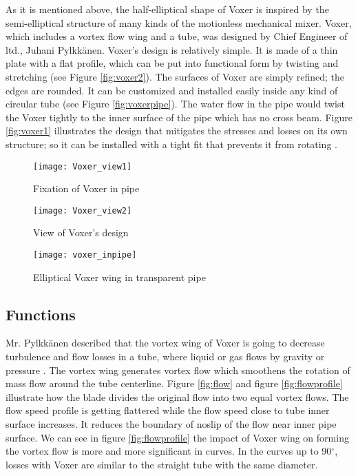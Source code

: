 As it is mentioned above, the half-elliptical shape of Voxer is inspired by the semi-elliptical structure of many kinds of the motionless mechanical mixer. Voxer, which includes a vortex flow wing and a tube, was designed by Chief Engineer of \gls{ltd}., Juhani Pylkkänen. Voxer's design is relatively simple. It is made of a thin plate with a flat profile, which can be put into functional form by twisting and stretching (see Figure \vref{fig:voxer2}). The surfaces of Voxer are simply refined; the edges are rounded. It can be customized and installed easily inside any kind of circular tube (see Figure \vref{fig:voxerpipe}). The water flow in the pipe would twist the Voxer tightly to the inner surface of the pipe which has no cross beam. Figure \vref{fig:voxer1} illustrates the design that mitigates the stresses and losses on its own structure; so it can be installed with a tight fit that prevents it from rotating \cite{voxer:article}.

\begin{figure}[h]
  \centering
  \texttt{[image: Voxer\_view1]}
  \caption{ Fixation of Voxer in pipe \cite{voxer:article}}
  \label{fig:voxer1}
\end{figure}

\begin{figure}[h]
  \centering
  \texttt{[image: Voxer\_view2]}
  \caption{ View of Voxer's design \cite{voxer:article}}
  \label{fig:voxer2}
\end{figure}

\begin{figure}[h]
  \centering
  \texttt{[image: voxer\_inpipe]}
  \caption{ Elliptical Voxer wing in transparent pipe}
  \label{fig:voxerpipe}
\end{figure}

\subsection{Functions}

Mr. Pylkkänen described that the vortex wing of Voxer is going to decrease turbulence and flow losses in a tube, where liquid or gas flows by gravity or pressure \cite{voxer:article}. The vortex wing generates vortex flow which smoothens the rotation of mass flow around the tube centerline. Figure \vref{fig:flow} and figure \vref{fig:flowprofile} illustrate how the blade divides the original flow into two equal vortex flows. The flow speed profile is getting flattered while the flow speed close to tube inner surface increases. It reduces the boundary of \gls{noslip} of the flow near inner pipe surface. We can see in figure \vref{fig:flowprofile} the impact of Voxer wing on forming the vortex flow is more and more significant in curves. In the curves up to 90$^{\circ}$, losses with Voxer are similar to the straight tube with the same diameter. 

